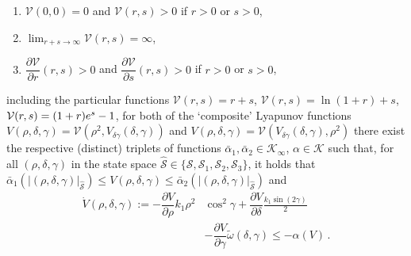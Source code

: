 \documentclass[10pt,a4paper]{amsart}
\begin{document}
\begin{proposition}
\begin{enumerate}
\item $\mathcal{V}(0,0)=0$ and $\mathcal{V}(r, s)>0$ if $r > 0 $ or $s > 0$, \label{it:pos_def_composite_Lyap_function} 
\item $\lim_{r+s\rightarrow\infty} \mathcal{V}(r,s) = \infty$,
\item $\dfrac{\partial \mathcal{V} }{\partial r }(r,s)>0$ and $\dfrac{\partial \mathcal{V} }{\partial s}(r,s)>0$  if $r>0$ or $s > 0$, \label{it:positive_partials}
\end{enumerate}
including the particular functions
 $\mathcal{V}(r,s)= r+s$, $\mathcal{V}(r,s)= \ln(1+r) + s$, $\mathcal{V}(r,s)= (1+r){\rm e}^{s} -1$,  
for both of the `composite' Lyapunov functions $V(\rho,\delta,\gamma) = \mathcal{V}\left(\rho^2,V_{\delta\gamma}(\delta,\gamma)\right)$ and $V(\rho,\delta,\gamma) = \mathcal{V}\left(V_{\delta\gamma}(\delta,\gamma), \rho^2 \right)$ there exist the respective (distinct) 
triplets of functions $\bar\alpha_1,\bar\alpha_2\in\mathcal{K}_\infty$, $\alpha\in\mathcal{K}$
such that,  for all $(\rho,\delta,\gamma)$ in the state space $\hat{\mathcal{S}}\in\{\mathcal{S},\mathcal{S}_1,\mathcal{S}_2,\mathcal{S}_3\}$, it holds that  
$ \bar\alpha_1(|(\rho,\delta, \gamma)|_{\hat{\mathcal{S}}}) \le V(\rho,\delta,\gamma) \le \bar\alpha_2(|(\rho,\delta, \gamma)|_{\hat{\mathcal{S}}})$ and 
\begin{align}
\dot{V}(\rho,\delta,\gamma) := 
-\dfrac{\partial V }{\partial \rho}%
k_1\rho^2&\cos^2\gamma  + %
\dfrac{\partial V}{\partial \delta}
\frac{k_1 \sin(2\gamma)}{2} 
 \nonumber\\
&-\dfrac{\partial V}{\partial\gamma}\tilde\omega(\delta,\gamma) \leq -\alpha(V)\,. \label{eq:V_dot_rho_delta_gamma}
\end{align}

\end{proposition}
\end{document}
